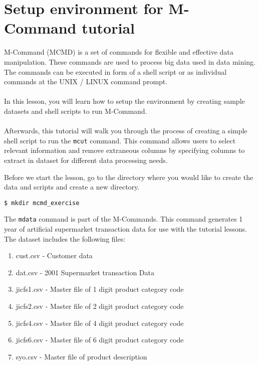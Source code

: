 

%

\section*{Setup environment for M-Command tutorial }

{M-Command (MCMD) is a set of commands for flexible and effective data manipulation. These commands are used to process big data used in data mining.  The commands can be executed in form of a shell script or as individual commands at the UNIX / LINUX command prompt. 
\\ 
\\
In this lesson, you will learn how to setup the environment by creating sample datasets and shell scripts to run M-Command.
\\
\\
Afterwards, this tutorial will walk you through the process of creating a simple shell script to run the \verb|mcut| command. This command allows users to select relevant information and remove extraneous columns by specifying columns to extract in dataset for different data processing needs.  }


Before we start the lesson, go to the directory where you would like to create the data and scripts and create a new directory. \\

\begin{verbatim}
$ mkdir mcmd_exercise
\end{verbatim}

The \verb|mdata| command is part of the M-Commands. This command generates 1 year of artificial supermarket transaction data for use with the tutorial lessons. The dataset includes the following files:   \\ 

\begin{enumerate}
 	\item cust.csv - Customer data
 	\item dat.csv - 2001 Supermarket transaction Data
	\item jicfs1.csv - Master file of 1 digit product category code
	\item jicfs2.csv - Master file of 2 digit product category code
	\item jicfs4.csv - Master file of 4 digit product category code
	\item jicfs6.csv - Master file of 6 digit product category code
	\item syo.csv - Master file of product description
\end{enumerate}

